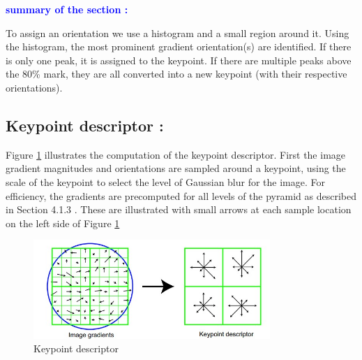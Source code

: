\textcolor{blue}{\textbf{summary of the section :}}

To assign an orientation we use a histogram and a small region around it. Using the histogram, the most prominent gradient orientation(s) are identified. If there is only one peak, it is assigned to the keypoint. If there are multiple peaks above the 80\% mark, they are all converted into a new keypoint (with their respective orientations).

\subsection{Keypoint descriptor :}

Figure \ref{fig:sift4} illustrates the computation of the keypoint descriptor. First the image gradient
magnitudes and orientations are sampled around a keypoint, using the scale of the keypoint
to select the level of Gaussian blur for the image. For efficiency, the gradients are precomputed
for all levels of the pyramid as described in Section 4.1.3 . These are illustrated with
small arrows at each sample location on the left side of Figure \ref{fig:sift4}

\begin{figure}[H]
\centering
\includegraphics[width=0.8\textwidth]{img/sift4.jpg}
\caption{ Keypoint descriptor }
\label{fig:sift4}
\end{figure}


